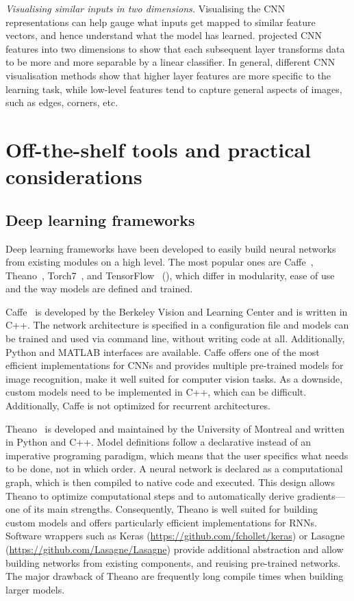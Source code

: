 \textit{Visualising similar inputs in two dimensions.} Visualising the CNN representations can help gauge what inputs get mapped to similar feature vectors, and hence understand what the model has learned. \citet{donahue_decaf:_2013} projected CNN features into two dimensions to show that each subsequent layer transforms data to be more and more separable by a linear classifier. In general, different CNN visualisation methods show that higher layer features are more specific to the learning task, while low-level features tend to capture general aspects of images, such as edges, corners, etc.


\section{Off-the-shelf tools and practical considerations}

\subsection{Deep learning frameworks}

Deep learning frameworks have been developed to easily build neural networks from existing modules on a high level. The most popular ones are Caffe~\citep{jia_caffe:_2014}, Theano~\citep{bastien_theano:_2012}, Torch7~\citep{collobert_torch7:_2011}, and TensorFlow~\citep{abadi_tensorflow:_2016} (), which differ in modularity, ease of use and the way models are defined and trained.

Caffe~\citep{jia_caffe:_2014} is developed by the Berkeley Vision and Learning Center and is written in C++. The network architecture is specified in a configuration file and models can be trained and used via command line, without writing code at all. Additionally, Python and MATLAB interfaces are available. Caffe offers one of the most efficient implementations for CNNs and provides multiple pre-trained models for image recognition, make it well suited for computer vision tasks. As a downside, custom models need to be implemented in C++, which can be difficult. Additionally, Caffe is not optimized for recurrent architectures.

Theano~\citep{bastien_theano:_2012} is developed and maintained by the University of Montreal and written in Python and C++. Model definitions follow a declarative instead of an imperative programing paradigm, which means that the user specifics what needs to be done, not in which order. A neural network is declared as a computational graph, which is then compiled to native code and executed. This design allows Theano to optimize computational steps and to automatically derive gradients—one of its main strengths. Consequently, Theano is well suited for building custom models and offers particularly efficient implementations for RNNs. Software wrappers such as Keras (\url{https://github.com/fchollet/keras}) or Lasagne (\url{https://github.com/Lasagne/Lasagne}) provide additional abstraction and allow building networks from existing components, and reuising pre-trained networks. The major drawback of Theano are frequently long compile times when building larger models.

